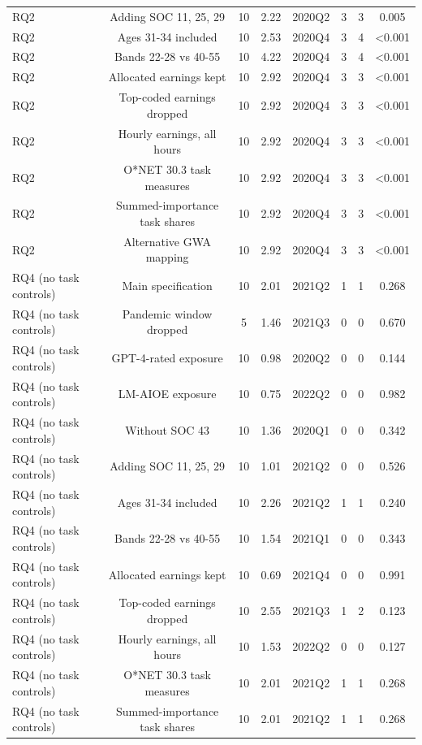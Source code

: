 \begin{table}[htbp]
\begin{tabular}{lccccccc}
RQ2 & Adding SOC 11, 25, 29 & 10 & 2.22 & 2020Q2 & 3 & 3 & 0.005 \\
RQ2 & Ages 31-34 included & 10 & 2.53 & 2020Q4 & 3 & 4 & <0.001 \\
RQ2 & Bands 22-28 vs 40-55 & 10 & 4.22 & 2020Q4 & 3 & 4 & <0.001 \\
RQ2 & Allocated earnings kept & 10 & 2.92 & 2020Q4 & 3 & 3 & <0.001 \\
RQ2 & Top-coded earnings dropped & 10 & 2.92 & 2020Q4 & 3 & 3 & <0.001 \\
RQ2 & Hourly earnings, all hours & 10 & 2.92 & 2020Q4 & 3 & 3 & <0.001 \\
RQ2 & O*NET 30.3 task measures & 10 & 2.92 & 2020Q4 & 3 & 3 & <0.001 \\
RQ2 & Summed-importance task shares & 10 & 2.92 & 2020Q4 & 3 & 3 & <0.001 \\
RQ2 & Alternative GWA mapping & 10 & 2.92 & 2020Q4 & 3 & 3 & <0.001 \\
RQ4 (no task controls) & Main specification & 10 & 2.01 & 2021Q2 & 1 & 1 & 0.268 \\
RQ4 (no task controls) & Pandemic window dropped & 5 & 1.46 & 2021Q3 & 0 & 0 & 0.670 \\
RQ4 (no task controls) & GPT-4-rated exposure & 10 & 0.98 & 2020Q2 & 0 & 0 & 0.144 \\
RQ4 (no task controls) & LM-AIOE exposure & 10 & 0.75 & 2022Q2 & 0 & 0 & 0.982 \\
RQ4 (no task controls) & Without SOC 43 & 10 & 1.36 & 2020Q1 & 0 & 0 & 0.342 \\
RQ4 (no task controls) & Adding SOC 11, 25, 29 & 10 & 1.01 & 2021Q2 & 0 & 0 & 0.526 \\
RQ4 (no task controls) & Ages 31-34 included & 10 & 2.26 & 2021Q2 & 1 & 1 & 0.240 \\
RQ4 (no task controls) & Bands 22-28 vs 40-55 & 10 & 1.54 & 2021Q1 & 0 & 0 & 0.343 \\
RQ4 (no task controls) & Allocated earnings kept & 10 & 0.69 & 2021Q4 & 0 & 0 & 0.991 \\
RQ4 (no task controls) & Top-coded earnings dropped & 10 & 2.55 & 2021Q3 & 1 & 2 & 0.123 \\
RQ4 (no task controls) & Hourly earnings, all hours & 10 & 1.53 & 2022Q2 & 0 & 0 & 0.127 \\
RQ4 (no task controls) & O*NET 30.3 task measures & 10 & 2.01 & 2021Q2 & 1 & 1 & 0.268 \\
RQ4 (no task controls) & Summed-importance task shares & 10 & 2.01 & 2021Q2 & 1 & 1 & 0.268 \\

\end{tabular}
\end{table}
